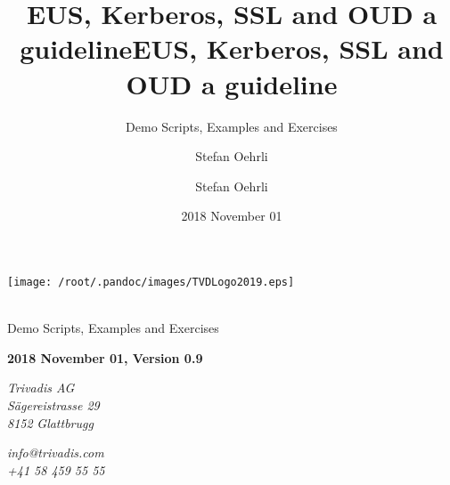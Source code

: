 \documentclass[a4paper,,tablecaptionabove]{scrartcl}
\title{EUS, Kerberos, SSL and OUD a guideline}
\subtitle{Demo Scripts, Examples and Exercises}
\author{Stefan Oehrli}
\date{2018 November 01}
\title{EUS, Kerberos, SSL and OUD a guideline}
\author{Stefan Oehrli}
\begin{document}
  \begin{titlepage}
  
  \begin{flushleft}
  \end{flushleft}

      \begin{flushright}
      \texttt{[image: /root/.pandoc/images/TVDLogo2019.eps]}
    \end{flushright}
  
  \begin{flushright}
    \vfill
    \\
        \bigskip
    {\Large \textsf{Demo Scripts, Examples and Exercises}}\\
    
    \bigskip

    \begin{flushright}
      \textbf{ 
        2018 November 01,
        Version 0.9 }\\
    \end{flushright}
    \vfill
  \end{flushright}

  \begin{flushright}
     \textit{Trivadis AG\\} 
     \textit{Sägereistrasse 29\\} 
     \textit{8152} 
     \textit{Glattbrugg} 
    \par
  \end{flushright}

  \begin{flushright}
    
    
     \textit{info@trivadis.com\\} 
     \textit{+41 58 459 55 55\\} 
  \end{flushright}
  \end{titlepage}

    

  
      {
            \setcounter{tocdepth}{3}
      \tableofcontents
              \newpage
          }
  
\end{document}
